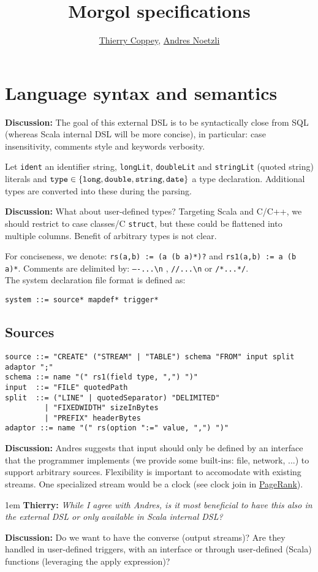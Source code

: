 \documentclass[11pt]{article}
\title{Morgol specifications}
\author{\href{mailto:thierry.coppey@epfl.ch}{\color{black} Thierry Coppey},
	\href{mailto:andres.notzli@epfl.ch}{\color{black} Andres Noetzli}}
\newlength{\dlen}
\def\discuss#1{\par\hspace{2em}
\setlength{\dlen}{\textwidth}
\addtolength{\dlen}{-2em}
\begin{minipage}{\dlen}\footnotesize {\bf\color{red} Discussion:} #1\end{minipage}\par}
\def\say#1#2{\begingroup\par\leftskip1em {\bf #1:} \it #2\par\endgroup}
\begin{document}
\tableofcontents
\newpage
\section{Language syntax and semantics}
\discuss{The goal of this external DSL is to be syntactically close from SQL (whereas Scala internal DSL will be more concise), in particular: case insensitivity, comments style and keywords verbosity.}
Let {\tt ident} an identifier string, {\tt longLit}, {\tt doubleLit} and {\tt stringLit} (quoted string) literals and ${\tt type}\in\{{\tt long}, {\tt double}, {\tt string}, {\tt date}\}$ a type declaration. Additional types are converted into these during the parsing.
\discuss{What about user-defined types? Targeting Scala and C/C++, we should restrict to case classes/C {\tt struct}, but these could be flattened into multiple columns. Benefit of arbitrary types is not clear.}
For conciseness, we denote: \verb$rs(a,b) := (a (b a)*)?$ and \verb$rs1(a,b) := a (b a)*$. Comments are delimited by: {\tt ----...\textbackslash n} , {\tt //...\textbackslash n} or {\tt /*...*/}.\\
The system declaration file format is defined as:
\begin{verbatim}
system ::= source* mapdef* trigger*
\end{verbatim}

\subsection{Sources}
\begin{verbatim}
source ::= "CREATE" ("STREAM" | "TABLE") schema "FROM" input split adaptor ";"
schema ::= name "(" rs1(field type, ",") ")"
input  ::= "FILE" quotedPath
split  ::= ("LINE" | quotedSeparator) "DELIMITED"
         | "FIXEDWIDTH" sizeInBytes
         | "PREFIX" headerBytes
adaptor ::= name "(" rs(option ":=" value, ",") ")"
\end{verbatim}

\discuss{Andres suggests that input should only be defined by an interface that the programmer implements (we provide some built-ins: file, network, ...) to support arbitrary sources. Flexibility is important to accomodate with existing streams. One specialized stream would be a clock (see clock join in \hyperref[pb:pagerank]{PageRank}).
\say{Thierry}{While I agree with Andres, is it most beneficial to have this also in the external DSL or only available in Scala internal DSL?}
}
\discuss{Do we want to have the converse (output streams)? Are they handled in user-defined triggers, with an interface or through user-defined (Scala) functions (leveraging the apply expression)?}
\end{document}

